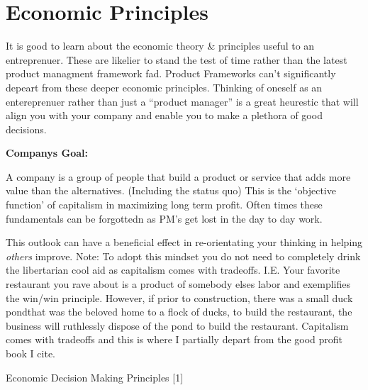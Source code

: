 \documentclass[
  letterpaper,
  DIV=11,
  numbers=noendperiod]{scrreprt}
\begin{document}

\hypertarget{economic-principles}{%
\chapter{Economic Principles}\label{economic-principles}}

It is good to learn about the economic theory \& principles useful to an
entreprenuer. These are likelier to stand the test of time rather than
the latest product managment framework fad. Product Frameworks can't
significantly depeart from these deeper economic principles. Thinking of
oneself as an entereprenuer rather than just a ``product manager'' is a
great heurestic that will align you with your company and enable you to
make a plethora of good decisions.

\textbf{Companys Goal:}

A company is a group of people that build a product or service that adds
more value than the alternatives. (Including the status quo) This is the
`objective function' of capitalism in maximizing long term profit. Often
times these fundamentals can be forgottedn as PM's get lost in the day
to day work.

This outlook can have a beneficial effect in re-orientating your
thinking in helping \emph{others} improve. Note: To adopt this mindset
you do not need to completely drink the libertarian cool aid as
capitalism comes with tradeoffs. I.E. Your favorite restaurant you rave
about is a product of somebody elses labor and exemplifies the win/win
principle. However, if prior to construction, there was a small duck
pondthat was the beloved home to a flock of ducks, to build the
restaurant, the business will ruthlessly dispose of the pond to build
the restaurant. Capitalism comes with tradeoffs and this is where I
partially depart from the good profit book I cite.

Economic Decision Making Principles {[}1{]}
\end{document}
